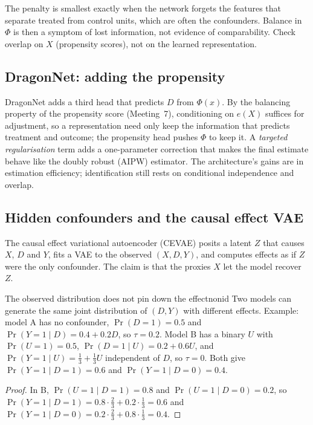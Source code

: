 \documentclass[11pt]{article}
\begin{document}
The penalty is smallest exactly when the network forgets the features that separate treated from control units,
which are often the confounders. Balance in $\Phi$ is then a symptom of lost information, not evidence of
comparability. Check overlap on $X$ (propensity scores), not on the learned representation.

\subsection{DragonNet: adding the propensity}

DragonNet adds a third head that predicts $D$ from $\Phi(x)$. By the balancing property of the propensity score
(Meeting~7), conditioning on $e(X)$ suffices for adjustment, so a representation need only keep the information that
predicts treatment and outcome; the propensity head pushes $\Phi$ to keep it. A \emph{targeted regularisation} term adds
a one-parameter correction that makes the final estimate behave like the doubly robust (AIPW) estimator. The
architecture's gains are in estimation efficiency; identification still rests on conditional independence and
overlap.

\subsection{Hidden confounders and the causal effect VAE}

The causal effect variational autoencoder (CEVAE) posits a latent $Z$ that causes $X$, $D$ and $Y$, fits a VAE to the
observed $(X, D, Y)$, and computes effects as if $Z$ were the only confounder. The claim is that the proxies $X$ let
the model recover $Z$.

\begin{prop}{The observed distribution does not pin down the effect}{nonid}
Two models can generate the same joint distribution of $(D, Y)$ with different effects. Example: model A has no
confounder, $\Pr(D=1) = 0.5$ and $\Pr(Y=1 \mid D) = 0.4 + 0.2D$, so $\tau = 0.2$. Model B has a binary $U$ with
$\Pr(U=1) = 0.5$, $\Pr(D=1 \mid U) = 0.2 + 0.6U$, and $\Pr(Y=1 \mid U) = \tfrac13 + \tfrac13 U$ independent of $D$, so
$\tau = 0$. Both give $\Pr(Y=1 \mid D=1) = 0.6$ and $\Pr(Y=1 \mid D=0) = 0.4$.
\end{prop}
\begin{proof}
In B, $\Pr(U=1 \mid D=1) = 0.8$ and $\Pr(U=1 \mid D=0) = 0.2$, so $\Pr(Y=1 \mid D=1) = 0.8 \cdot \tfrac23 + 0.2 \cdot \tfrac13 = 0.6$
and $\Pr(Y=1 \mid D=0) = 0.2 \cdot \tfrac23 + 0.8 \cdot \tfrac13 = 0.4$.
\end{proof}
\end{document}
